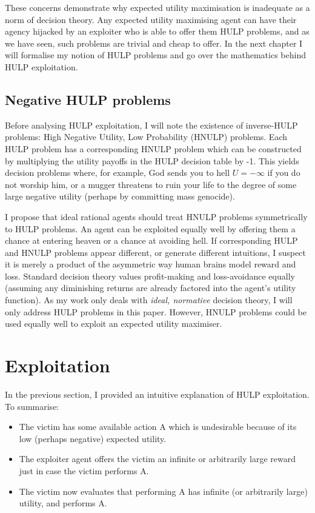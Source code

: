 \documentclass{article}
\begin{document}
These concerns demonstrate why expected utility maximisation is inadequate as a norm of decision theory. Any expected utility maximising agent can have their agency hijacked by an exploiter who is able to offer them HULP problems, and as we have seen, such problems are trivial and cheap to offer. In the next chapter I will formalise my notion of HULP problems and go over the mathematics behind HULP exploitation.

\subsection{Negative HULP problems}

Before analysing HULP exploitation, I will note the existence of inverse-HULP problems: High Negative Utility, Low Probability (HNULP) problems. Each HULP problem has a corresponding HNULP problem which can be constructed by multiplying the utility payoffs in the HULP decision table by -1. This yields decision problems where, for example, God sends you to hell \(U=-\infty\) if you do not worship him, or a mugger threatens to ruin your life to the degree of some large negative utility (perhaps by committing mass genocide). 

I propose that ideal rational agents should treat HNULP problems symmetrically to HULP problems. An agent can be exploited equally well by offering them a chance at entering heaven or a chance at avoiding hell. If corresponding HULP and HNULP problems appear different, or generate different intuitions, I suspect it is merely a product of the asymmetric way human brains model reward and loss. Standard decision theory values profit-making and loss-avoidance equally (assuming any diminishing returns are already factored into the agent's utility function). As my work only deals with \textit{ideal, normative} decision theory, I will only address HULP problems in this paper. However, HNULP problems could be used equally well to exploit an expected utility maximiser.

\newpage\section{Exploitation}

In the previous section, I provided an intuitive explanation of HULP exploitation. To summarise:

\begin{itemize}
\item The victim has some available action A which is undesirable because of its low (perhaps negative) expected utility.
\item The exploiter agent offers the victim an infinite or arbitrarily large reward just in case the victim performs A. 
\item The victim now evaluates that performing A has infinite (or arbitrarily large) utility, and performs A.
\end{itemize}
\end{document}
